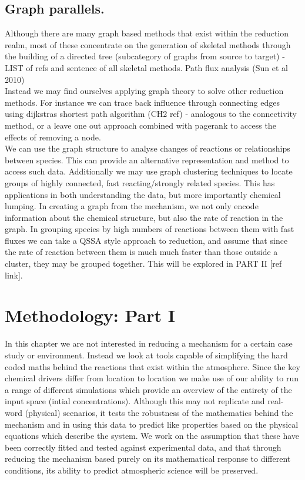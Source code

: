 
\subsection{Graph parallels. }
Although there are many graph based methods that exist within the reduction realm, most of these concentrate on the generation of skeletal methods through the building of a directed tree (subcategory of graphs from source to target) - LIST of refs and sentence of all skeletal methods. Path flux analysis (Sun et al 2010)\\

Instead we may find ourselves applying graph theory to solve other reduction methods. For instance we can trace back influence through connecting edges using dijkstras shortest path algorithm (CH2 ref) - analogous to the connectivity method, or a leave one out approach combined with pagerank to access the effects of removing a node.\\

We can use the graph structure to analyse changes of reactions or relationships between species. This can provide an alternative representation and method to access such data. Additionally we may use graph clustering techniques to locate groups of highly connected, fast reacting/strongly related species. This has applications in both understanding the data, but more importantly chemical lumping. In creating a graph from the mechanism, we not only encode information about the chemical structure, but also the rate of reaction in the graph. In grouping species by high numbers of reactions between them with fast fluxes we can take a QSSA style approach to reduction, and assume that since the rate of reaction between them is much much faster than those outside a cluster, they may be grouped together. This will be explored in PART II [ref link].



\section{Methodology: Part I }
In this chapter we are not interested in reducing a mechanism for a certain case study or environment. Instead we look at tools capable of simplifying the hard coded maths behind the reactions that exist within the atmosphere. Since the key chemical drivers differ from location to location we make use of our ability to run a range of different simulations which provide an overview of the entirety of the input space (intial concentrations). Although this may not replicate and real-word (physical) scenarios, it tests the robustness of the mathematics behind the mechanism and in using this data to predict like properties based on the physical equations which describe the system. We work on the assumption that these have been correctly fitted and tested against experimental data, and that through reducing the mechanism based purely on its mathematical response to different conditions, its ability to predict atmospheric science will be preserved. \\

